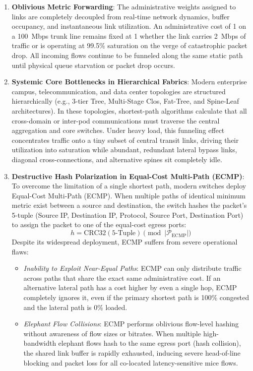 \begin{enumerate}[label=\textbf{\arabic*.}]
    \item \textbf{Oblivious Metric Forwarding}: The administrative weights assigned to links are completely decoupled from real-time network dynamics, buffer occupancy, and instantaneous link utilization. An administrative cost of 1 on a 100~Mbps trunk line remains fixed at 1 whether the link carries 2~Mbps of traffic or is operating at 99.5\% saturation on the verge of catastrophic packet drop. All incoming flows continue to be funneled along the same static path until physical queue starvation or packet drop occurs.
    \item \textbf{Systemic Core Bottlenecks in Hierarchical Fabrics}: Modern enterprise campus, telecommunication, and data center topologies are structured hierarchically (e.g., 3-tier Tree, Multi-Stage Clos, Fat-Tree, and Spine-Leaf architectures). In these topologies, shortest-path algorithms calculate that all cross-domain or inter-pod communications must traverse the central aggregation and core switches. Under heavy load, this funneling effect concentrates traffic onto a tiny subset of central transit links, driving their utilization into saturation while abundant, redundant lateral bypass links, diagonal cross-connections, and alternative spines sit completely idle.
    \item \textbf{Destructive Hash Polarization in Equal-Cost Multi-Path (ECMP)}: To overcome the limitation of a single shortest path, modern switches deploy Equal-Cost Multi-Path (ECMP). When multiple paths of identical minimum metric exist between a source and destination, the switch hashes the packet's 5-tuple (Source IP, Destination IP, Protocol, Source Port, Destination Port) to assign the packet to one of the equal-cost egress ports:
    \begin{equation}
        h = \text{CRC32}(\text{5-Tuple}) \pmod{|\mathcal{P}_{\text{ECMP}}|}
    \end{equation}
    Despite its widespread deployment, ECMP suffers from severe operational flaws:
    \begin{itemize}
        \item \emph{Inability to Exploit Near-Equal Paths}: ECMP can only distribute traffic across paths that share the exact same administrative cost. If an alternative lateral path has a cost higher by even a single hop, ECMP completely ignores it, even if the primary shortest path is 100\% congested and the lateral path is 0\% loaded.
        \item \emph{Elephant Flow Collisions}: ECMP performs oblivious flow-level hashing without awareness of flow sizes or bitrates. When multiple high-bandwidth elephant flows hash to the same egress port (hash collision), the shared link buffer is rapidly exhausted, inducing severe head-of-line blocking and packet loss for all co-located latency-sensitive mice flows.

\end{itemize}
\end{enumerate}
